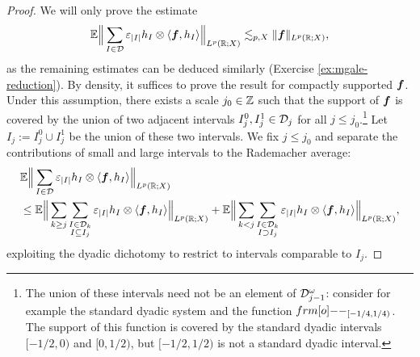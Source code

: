 \begin{proof}
  We will only prove the estimate
  \begin{equation*}
    \mathbb{E} \Big\| \sum_{I \in \mathcal{D}} \varepsilon_{|I|} h_{I} \otimes \langle \bm{f}, h_{I} \rangle \Big\|_{L^p(\mathbb{R};X)} \lesssim_{p,X}     \|\bm{f}\|_{L^p(\mathbb{R};X)},
  \end{equation*}
  as the remaining estimates can be deduced similarly (Exercise \ref{ex:mgale-reduction}).
  By density, it suffices to prove the result for compactly supported $\bm{f}$.
  Under this assumption, there exists a scale $j_{0} \in \mathbb{Z}$ such that the support of $\bm{f}$ is covered by the union of two adjacent intervals $I_{j}^{0}, I_{j}^{1} \in \mathcal{D}_{j}$ for all $j \leq j_{0}$.\footnote{The union of these intervals need not be an element of $\mathcal{D}^{\omega}_{j-1}$: consider for example the standard dyadic system and the function $\1_{[-1/4,1/4)}$.
    The support of this function is covered by the standard dyadic intervals $[-1/2,0)$ and $[0,1/2)$, but $[-1/2,1/2)$ is not a standard dyadic interval.}
  Let $I_{j} := I_{j}^{0} \cup I_{j}^{1}$ be the union of these two intervals.
  We fix $j \leq j_{0}$ and separate the contributions of small and large intervals to the Rademacher average: 
  \begin{equation*}
    \begin{aligned}
      &\mathbb{E} \Big\| \sum_{I \in \mathcal{D}} \varepsilon_{|I|} h_{I} \otimes \langle \bm{f}, h_{I} \rangle \Big\|_{L^p(\mathbb{R};X)} \\
      &\leq \mathbb{E} \Big\| \sum_{k \geq j} \sum_{\substack{I \in \mathcal{D}_{k} \\ I \subseteq I_{j}}} \varepsilon_{|I|} h_{I} \otimes \langle \bm{f}, h_{I} \rangle \Big\|_{L^p(\mathbb{R};X)}
      + \mathbb{E} \Big\| \sum_{k < j} \sum_{\substack{I \in \mathcal{D}_{k} \\ I \supset I_{j}}} \varepsilon_{|I|} h_{I} \otimes \langle \bm{f}, h_{I} \rangle \Big\|_{L^p(\mathbb{R};X)},
    \end{aligned}
  \end{equation*}
  exploiting the dyadic dichotomy to restrict to intervals comparable to $I_{j}$.
  

\end{proof}
